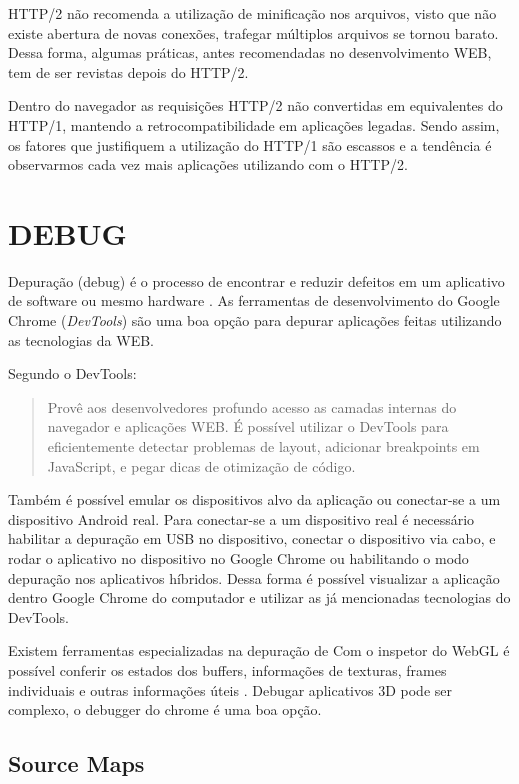 HTTP/2 não recomenda a utilização de minificação nos arquivos,
visto que não existe abertura de novas conexões, trafegar múltiplos
arquivos se tornou barato. Dessa forma, algumas práticas, antes
recomendadas no desenvolvimento WEB, tem de ser revistas depois do
HTTP/2.

Dentro do navegador as requisições HTTP/2 não convertidas em
equivalentes do HTTP/1, mantendo a retrocompatibilidade em aplicações
legadas. Sendo assim, os fatores que justifiquem a utilização do HTTP/1
são escassos e a tendência é observarmos cada vez mais aplicações
utilizando com o HTTP/2.

\section{DEBUG}

Depuração (debug) é o processo de encontrar e reduzir defeitos 
em um aplicativo de software ou mesmo hardware \autocite{depuracao}.
As ferramentas de desenvolvimento do Google Chrome (\textit{DevTools})
são uma boa opção para depurar aplicações feitas utilizando as
tecnologias da WEB.

Segundo \cite{chromeDevTools} o DevTools:
\begin{quote}
Provê aos desenvolvedores profundo acesso as camadas internas do
navegador e aplicações WEB. É possível utilizar o DevTools
para eficientemente detectar problemas de layout, adicionar
breakpoints em JavaScript, e pegar dicas de otimização de código.
\end{quote}

Também é possível emular os dispositivos alvo da aplicação ou
conectar-se a um dispositivo Android real. Para conectar-se a um
dispositivo real é necessário habilitar a depuração em USB no
dispositivo, conectar o dispositivo via cabo, e rodar o aplicativo no
dispositivo no Google Chrome ou habilitando o modo depuração nos
aplicativos híbridos. Dessa forma é possível visualizar a aplicação
dentro Google Chrome do computador e utilizar as já mencionadas tecnologias do DevTools.

Existem ferramentas especializadas na depuração de
Com o inspetor do WebGL é possível conferir os estados dos buffers, informações de texturas, frames individuais e outras informações úteis \autocite{html5mostwanted}.
Debugar aplicativos 3D pode ser complexo, o debugger do chrome é uma boa opção.

\subsection{Source Maps}

